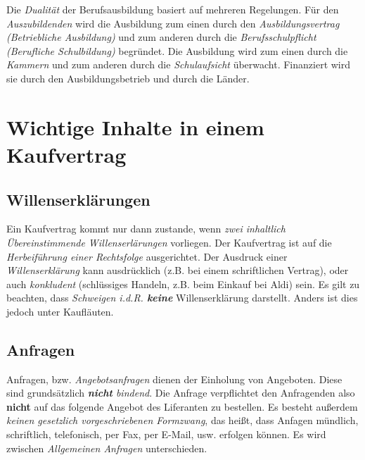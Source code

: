 \documentclass[a4paper, 12pt]{report}
\begin{document}
\begin{multicols}{2}
Die \emph{Dualität} der Berufsausbildung basiert auf mehreren Regelungen. Für
den \emph{Auszubildenden} wird die Ausbildung zum einen durch den
\emph{Ausbildungsvertrag (Betriebliche Ausbildung)} und zum anderen durch die
\emph{Berufsschulpflicht (Berufliche Schulbildung)} begründet. Die Ausbildung
wird zum einen durch die \emph{Kammern} und zum anderen durch die
\emph{Schulaufsicht} überwacht. Finanziert wird sie durch den Ausbildungsbetrieb
und durch die Länder.




\section{Wichtige Inhalte in einem Kaufvertrag}

\subsection{Willenserklärungen}

Ein Kaufvertrag kommt nur dann zustande, wenn \emph{zwei inhaltlich
Übereinstimmende Willenserlärungen} vorliegen. Der Kaufvertrag ist auf die
\emph{Herbeiführung einer Rechtsfolge} ausgerichtet. Der Ausdruck einer
\emph{Willenserklärung} kann ausdrücklich (z.B. bei einem schriftlichen
Vertrag), oder auch \emph{konkludent} (schlüssiges Handeln, z.B. beim Einkauf
bei Aldi) sein. Es gilt zu beachten, dass \emph{Schweigen i.d.R. \textbf{keine}}
Willenserklärung darstellt. Anders ist dies jedoch unter Kaufläuten. \\

\subsection{Anfragen}

Anfragen, bzw. \emph{Angebotsanfragen} dienen der Einholung von Angeboten. Diese
sind grundsätzlich \emph{\textbf{nicht} bindend}. Die Anfrage verpflichtet den
Anfragenden also \textbf{nicht} auf das folgende Angebot des Liferanten zu
bestellen. Es besteht außerdem \emph{keinen gesetzlich vorgeschriebenen
Formzwang}, das heißt, dass Anfagen mündlich, schriftlich, telefonisch, per Fax,
per E-Mail, usw. erfolgen können. Es wird zwischen \emph{Allgemeinen Anfragen}
unterschieden. \\


\end{multicols}
\end{document}
